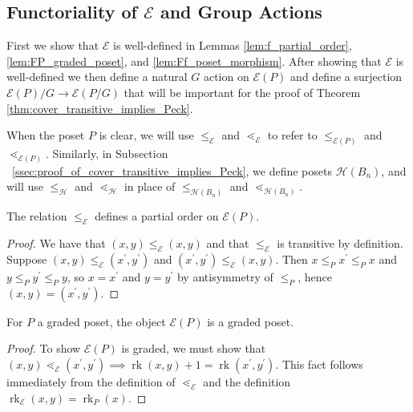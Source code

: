 \documentclass[smallextended, envcountsame, numbook]{svjour3}
\numberwithin{equation}{section}
\newcommand\ssec{\subsection}
\newcommand\rk{\operatorname{rk}}
\begin{document}
\ssec{Functoriality of $\mathcal E$ and Group Actions}
\label{ssec:functoriality}
First we show that $\mathcal{E}$ is well-defined in Lemmas \ref{lem:f_partial_order}, \ref{lem:FP_graded_poset}, and \ref{lem:Ff_poset_morphism}.  After showing that $\mathcal E$ is well-defined we then define a natural $G$ action on $\mathcal E(P)$ and define a surjection $\mathcal E(P)/G\rightarrow \mathcal E(P/G)$ that will be important for the proof of Theorem \ref{thm:cover_transitive_implies_Peck}.

When the poset $P$ is clear, we will use $\leq_{\mathcal E}$ and $\lessdot_{\mathcal E}$ to refer to $\leq_{\mathcal E(P)}$ and $\lessdot_{\mathcal E(P)}$. Similarly, in Subsection ~\ref{ssec:proof_of_cover_transitive_implies_Peck}, we define posets $\mathcal H(B_n)$, and will use $\leq_{\mathcal H}$ and $\lessdot_{\mathcal H}$ in place of $\leq_{\mathcal H(B_n)}$ and $\lessdot_{\mathcal H(B_n)}$.

\begin{lemma}\label{lem:f_partial_order}
The relation $\le_{\mathcal E}$ defines a partial order on $\mathcal E(P)$.
\end{lemma}

\begin{proof}
We have that $(x, y)\le_{\mathcal E} (x, y)$ and that $\le_{\mathcal E}$ is transitive by definition.  Suppose $(x, y)\le_{\mathcal E} (x^\prime, y^\prime)$ and $(x^\prime, y^\prime)\le_{\mathcal E} (x, y)$.  Then $x\le_P x^\prime \le_P x$ and $y\le_P y^\prime \le_P y$, so $x = x^\prime$ and $y=y^\prime$ by antisymmetry of $\le_P$, hence $(x, y) = (x^\prime, y^\prime)$.
\end{proof}

\begin{lemma}\label{lem:FP_graded_poset}
For $P$ a graded poset, the object $\mathcal E(P)$ is a graded poset.
\end{lemma}

\begin{proof}
To show $\mathcal E(P)$ is graded, we must show that $(x, y) \lessdot_{\mathcal E} (x^\prime, y^\prime) \implies \rk(x, y)+1 = \rk(x^\prime , y^\prime)$.  This fact follows immediately from the definition of $\lessdot_{\mathcal E}$ and the definition $\rk_{\mathcal E}(x, y) = \rk_P(x)$.
\end{proof}
\end{document}
